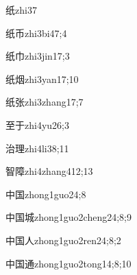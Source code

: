 \begin{verbete}{纸}{zhi3}{7}
\end{verbete}

\begin{verbete}{纸币}{zhi3bi4}{7;4}
\end{verbete}

\begin{verbete}{纸巾}{zhi3jin1}{7;3}
\end{verbete}

\begin{verbete}{纸烟}{zhi3yan1}{7;10}
\end{verbete}

\begin{verbete}{纸张}{zhi3zhang1}{7;7}
\end{verbete}

\begin{verbete}{至于}{zhi4yu2}{6;3}
\end{verbete}

\begin{verbete}{治理}{zhi4li3}{8;11}
\end{verbete}

\begin{verbete}{智障}{zhi4zhang4}{12;13}
\end{verbete}

\begin{verbete}{中国}{zhong1guo2}{4;8}
\end{verbete}

\begin{verbete}{中国城}{zhong1guo2cheng2}{4;8;9}
\end{verbete}

\begin{verbete}{中国人}{zhong1guo2ren2}{4;8;2}
\end{verbete}

\begin{verbete}{中国通}{zhong1guo2tong1}{4;8;10}
\end{verbete}


